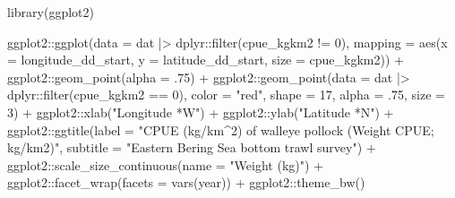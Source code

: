 \documentclass[
  letterpaper,
  oneside,
  open=any]{scrbook}
\newenvironment{Shaded}{\begin{snugshade}}{\end{snugshade}}
\newcommand{\AttributeTok}[1]{\textcolor[rgb]{0.40,0.45,0.13}{#1}}
\newcommand{\DecValTok}[1]{\textcolor[rgb]{0.68,0.00,0.00}{#1}}
\newcommand{\FunctionTok}[1]{\textcolor[rgb]{0.28,0.35,0.67}{#1}}
\newcommand{\NormalTok}[1]{\textcolor[rgb]{0.00,0.23,0.31}{#1}}
\newcommand{\SpecialCharTok}[1]{\textcolor[rgb]{0.37,0.37,0.37}{#1}}
\newcommand{\StringTok}[1]{\textcolor[rgb]{0.13,0.47,0.30}{#1}}
\begin{document}
\begin{Shaded}
\begin{Highlighting}[]
\FunctionTok{library}\NormalTok{(ggplot2)}

\NormalTok{ggplot2}\SpecialCharTok{::}\FunctionTok{ggplot}\NormalTok{(}\AttributeTok{data =}\NormalTok{ dat }\SpecialCharTok{|\textgreater{}}\NormalTok{ dplyr}\SpecialCharTok{::}\FunctionTok{filter}\NormalTok{(cpue\_kgkm2 }\SpecialCharTok{!=} \DecValTok{0}\NormalTok{), }
                \AttributeTok{mapping =} \FunctionTok{aes}\NormalTok{(}\AttributeTok{x =}\NormalTok{ longitude\_dd\_start, }
                              \AttributeTok{y =}\NormalTok{ latitude\_dd\_start, }
                              \AttributeTok{size =}\NormalTok{ cpue\_kgkm2)) }\SpecialCharTok{+} 
\NormalTok{  ggplot2}\SpecialCharTok{::}\FunctionTok{geom\_point}\NormalTok{(}\AttributeTok{alpha =}\NormalTok{ .}\DecValTok{75}\NormalTok{) }\SpecialCharTok{+}
\NormalTok{  ggplot2}\SpecialCharTok{::}\FunctionTok{geom\_point}\NormalTok{(}\AttributeTok{data =}\NormalTok{ dat }\SpecialCharTok{|\textgreater{}}\NormalTok{ dplyr}\SpecialCharTok{::}\FunctionTok{filter}\NormalTok{(cpue\_kgkm2 }\SpecialCharTok{==} \DecValTok{0}\NormalTok{), }
                      \AttributeTok{color =} \StringTok{"red"}\NormalTok{, }
                      \AttributeTok{shape =} \DecValTok{17}\NormalTok{,}
                      \AttributeTok{alpha =}\NormalTok{ .}\DecValTok{75}\NormalTok{,}
                      \AttributeTok{size =} \DecValTok{3}\NormalTok{) }\SpecialCharTok{+}
\NormalTok{  ggplot2}\SpecialCharTok{::}\FunctionTok{xlab}\NormalTok{(}\StringTok{"Longitude *W"}\NormalTok{) }\SpecialCharTok{+}
\NormalTok{  ggplot2}\SpecialCharTok{::}\FunctionTok{ylab}\NormalTok{(}\StringTok{"Latitude *N"}\NormalTok{) }\SpecialCharTok{+}
\NormalTok{  ggplot2}\SpecialCharTok{::}\FunctionTok{ggtitle}\NormalTok{(}\AttributeTok{label =} \StringTok{"CPUE (kg/km\^{}2) of walleye pollock (Weight CPUE; kg/km2)"}\NormalTok{, }
                   \AttributeTok{subtitle =} \StringTok{"Eastern Bering Sea bottom trawl survey"}\NormalTok{) }\SpecialCharTok{+}
\NormalTok{  ggplot2}\SpecialCharTok{::}\FunctionTok{scale\_size\_continuous}\NormalTok{(}\AttributeTok{name =} \StringTok{"Weight (kg)"}\NormalTok{) }\SpecialCharTok{+} 
\NormalTok{  ggplot2}\SpecialCharTok{::}\FunctionTok{facet\_wrap}\NormalTok{(}\AttributeTok{facets =} \FunctionTok{vars}\NormalTok{(year)) }\SpecialCharTok{+} 
\NormalTok{  ggplot2}\SpecialCharTok{::}\FunctionTok{theme\_bw}\NormalTok{()}
\end{Highlighting}
\end{Shaded}
\end{document}
